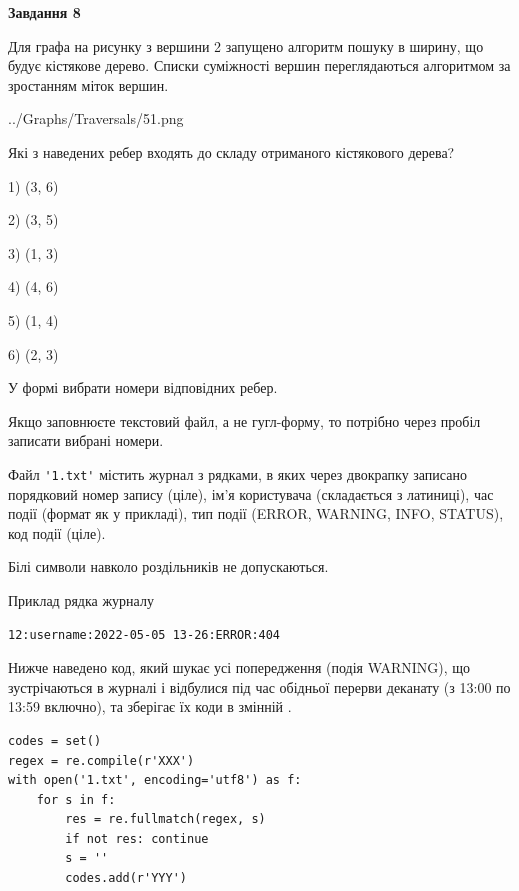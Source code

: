\documentclass[12pt, ukrainian]{article}
\def\code#1{\Verb!#1!}
\begin{document}
{\begin {large}
{\begin {center}\textbf{Завдання 8}\end {center}}\par
Для графа на рисунку з вершини 2 запущено алгоритм пошуку в ширину, що будує кістякове дерево. Списки суміжності вершин переглядаються алгоритмом за зростанням міток вершин.\par
\begin{center}
	{../Graphs/Traversals/51.png}
\end{center}
\par Які з наведених ребер входять до складу отриманого кістякового дерева?\par
1) (3, 6)\par
2) (3, 5)\par
3) (1, 3)\par
4) (4, 6)\par
5) (1, 4)\par
6) (2, 3)\par
{\vskip 15pt} У формі вибрати номери відповідних ребер.


Якщо заповнюєте текстовий файл, а не гугл-форму, то потрібно через пробіл записа\-ти вибрані номери.\par
\newpage


Файл \code{'1.txt'} містить журнал з рядками, в яких через двокрапку записано поряд\-ко\-вий номер запису (ціле), ім'я користувача (складається з латиниці), час події (фор\-мат як у прикладі), тип події (ERROR, WARNING, INFO, STATUS), код події (ціле).

Білі символи навколо роздільників не допускаються.

Приклад рядка журналу



\begin{verbatim}
12:username:2022-05-05 13-26:ERROR:404
\end{verbatim}


Нижче наведено код, який шукає усі попередження (подія WARNING), що зустрі\-ча\-ються в журналі і відбулися під час обідньої перерви деканату (з 13:00 по 13:59 включно), та зберігає їх коди в змінній .



\begin{verbatim}
codes = set()
regex = re.compile(r'XXX')
with open('1.txt', encoding='utf8') as f:
    for s in f:
        res = re.fullmatch(regex, s)
        if not res: continue
        s = ''
        codes.add(r'YYY')
\end{verbatim}





\end{large}}
\end{document}

